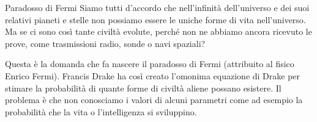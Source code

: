 \documentclass[12pt]{book} %
\begin{document}
\begin{mdframed}[linewidth=1pt]
Paradosso di Fermi
Siamo tutti d'accordo che nell'infinità dell'universo e
dei suoi relativi pianeti e stelle non possiamo essere le uniche forme di vita nell'universo. Ma
se ci sono così tante civiltà evolute, perché non ne abbiamo ancora ricevuto le prove, come trasmissioni radio, sonde o
navi spaziali?

Questa è la domanda che fa nascere il paradosso di Fermi (attribuito al fisico Enrico
Fermi). Francis
Drake ha così creato l'omonima equazione di Drake per stimare la probabilità di quante forme di
civiltà aliene possano esistere. Il problema è che non conosciamo i valori di alcuni parametri come ad esempio la
probabilità che la vita o l'intelligenza si sviluppino.


\end{mdframed}
\end{document}
